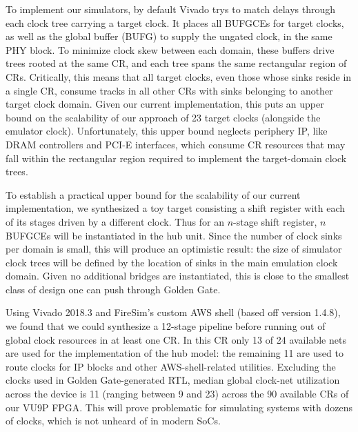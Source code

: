 To implement our simulators, by default Vivado trys to match delays through
each clock tree carrying a target clock. It places all BUFGCEs for target clocks, as well as the global buffer
(BUFG) to supply the ungated clock, in the same PHY block. To minimize clock
skew between each domain, these buffers drive trees rooted at the same CR, and
each tree spans the same rectangular region of CRs. Critically, this means that
all target clocks, even those whose sinks reside in a single CR, consume tracks in all other CRs
with sinks belonging to another target clock domain. Given our current implementation, this puts an upper
bound on the scalability of our approach of 23 target clocks (alongside the
emulator clock). Unfortunately, this upper bound neglects periphery IP,
like DRAM controllers and PCI-E interfaces, which consume CR resources that may
fall within the rectangular region required to implement the target-domain
clock trees.

To establish a practical upper bound for the scalability of our current
implementation, we synthesized a toy target consisting a shift register with
each of its stages driven by a different clock.  Thus for an $n$-stage shift
register, $n$ BUFGCEs will be instantiated in the hub unit. Since the number of
clock sinks per domain is small, this will produce an optimistic result: the
size of simulator clock trees will be defined by the location of sinks in the
main emulation clock domain. Given no additional bridges are instantiated, this
is close to the smallest class of design one can push through Golden Gate.

Using Vivado 2018.3 and FireSim's custom AWS shell (based off version 1.4.8),
we found that we could synthesize a 12-stage pipeline before running out of
global clock resources in at least one CR. In this CR only 13 of
24 available nets are used for the implementation of the hub model: the
remaining 11 are used to route clocks for IP blocks and other AWS-shell-related utilities. Excluding the clocks used in Golden
Gate-generated RTL, median global clock-net utilization across the device is 11
(ranging between 9 and 23) across the 90 available CRs of our VU9P FPGA.
This will prove problematic for simulating systems with dozens of clocks,
which is not unheard of in modern SoCs.

